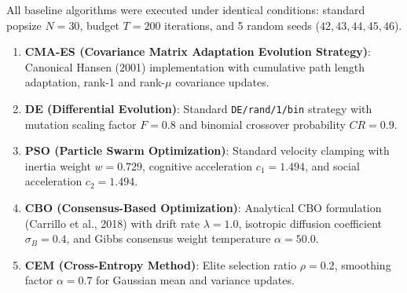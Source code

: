 \documentclass[10pt,journal,compsoc]{IEEEtran}
\begin{document}
All baseline algorithms were executed under identical conditions: standard popsize $N = 30$, budget $T = 200$ iterations, and 5 random seeds ($42, 43, 44, 45, 46$).

\begin{enumerate}
\item \textbf{CMA-ES (Covariance Matrix Adaptation Evolution Strategy)}: Canonical Hansen (2001) implementation with cumulative path length adaptation, rank-1 and rank-$\mu$ covariance updates.
\item \textbf{DE (Differential Evolution)}: Standard \texttt{DE/rand/1/bin} strategy with mutation scaling factor $F = 0.8$ and binomial crossover probability $CR = 0.9$.
\item \textbf{PSO (Particle Swarm Optimization)}: Standard velocity clamping with inertia weight $w = 0.729$, cognitive acceleration $c_1 = 1.494$, and social acceleration $c_2 = 1.494$.
\item \textbf{CBO (Consensus-Based Optimization)}: Analytical CBO formulation (Carrillo et al., 2018) with drift rate $\lambda = 1.0$, isotropic diffusion coefficient $\sigma_B = 0.4$, and Gibbs consensus weight temperature $\alpha = 50.0$.
\item \textbf{CEM (Cross-Entropy Method)}: Elite selection ratio $\rho = 0.2$, smoothing factor $\alpha = 0.7$ for Gaussian mean and variance updates.
\end{enumerate}
\end{document}

